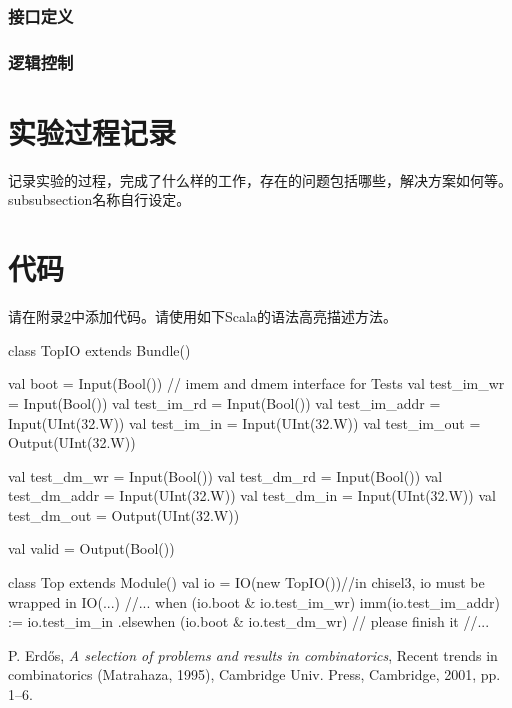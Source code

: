 \documentclass[a4paper]{article}
\begin{document}
\subsubsection{接口定义}
\subsubsection{逻辑控制}


\section{实验过程记录}\label{labrec}
记录实验的过程，完成了什么样的工作，存在的问题包括哪些，解决方案如何等。subsubsection名称自行设定。

\appendix
\section{代码}\label{sub:app.code}
请在附录\ref{sub:app.code}中添加代码。请使用如下Scala的语法高亮描述方法。
\begin{scala}
class TopIO extends Bundle() {
	val boot = Input(Bool()) 
// imem and dmem interface for Tests
	val test_im_wr		= Input(Bool())
	val test_im_rd 		= Input(Bool())
	val test_im_addr 	= Input(UInt(32.W))
	val test_im_in 		= Input(UInt(32.W))
	val test_im_out 	= Output(UInt(32.W))

	val test_dm_wr		= Input(Bool())
	val test_dm_rd 		= Input(Bool())
	val test_dm_addr 	= Input(UInt(32.W))
	val test_dm_in 		= Input(UInt(32.W))
	val test_dm_out 	= Output(UInt(32.W))

	val valid			= Output(Bool())
}
class Top extends Module() {
	val io 		= IO(new TopIO())//in chisel3, io must be wrapped in IO(...) 
	//...
	when (io.boot & io.test_im_wr){
		imm(io.test_im_addr) := io.test_im_in
		} .elsewhen (io.boot & io.test_dm_wr){
		// please finish it
		} //...
}
\end{scala}
\newpage
\begin{thebibliography}{9}
 P. Erd\H os, \emph{A selection of problems and
results in combinatorics}, Recent trends in combinatorics (Matrahaza,
1995), Cambridge Univ. Press, Cambridge, 2001, pp. 1--6.
\end{thebibliography}
\end{document}
